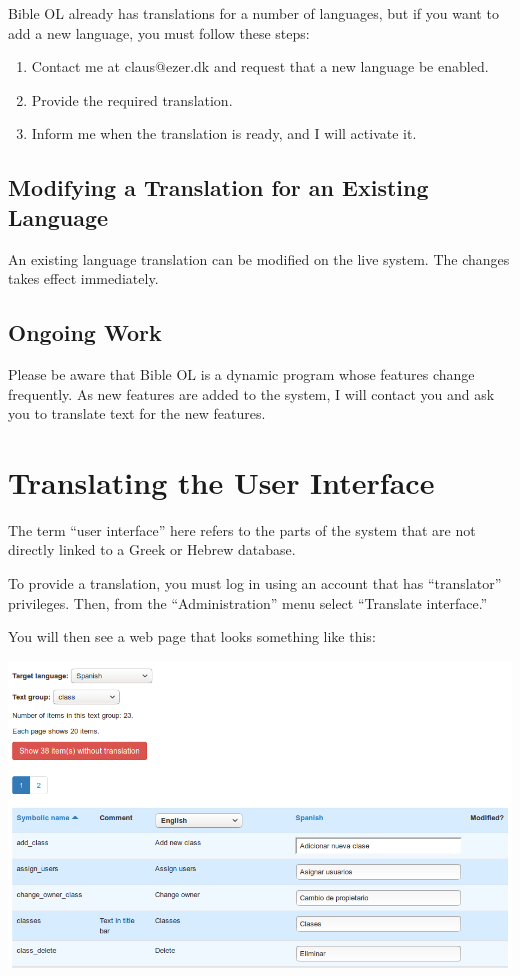 \documentclass[11pt,oneside,a4paper]{memoir}
\begin{document}
Bible OL already has translations for a number of languages, but if you want to add a new language,
you must follow these steps:

\begin{enumerate}
\item Contact me at claus@ezer.dk and request that a new language be enabled.
\item Provide the required translation.
\item Inform me when the translation is ready, and I will activate it.
\end{enumerate}


\section{Modifying a Translation for an Existing Language}

An existing language translation can be modified on the live system. The changes takes effect
immediately.


\section{Ongoing Work}

Please be aware that Bible OL is a dynamic program whose features change frequently. As new features
are added to the system, I will contact you and ask you to translate text for the new features.



\chapter{Translating the User Interface}

The term ``user interface'' here refers to the parts of the system that are not directly linked to a
Greek or Hebrew database.

To provide a translation, you must log in using an account that has ``translator'' privileges. Then,
from the ``Administration'' menu select ``Translate interface.''

You will then see a web page that looks something like this:

\begin{center}
  \includegraphics[width=0.9\linewidth]{interface.png}
\end{center}
\end{document}
